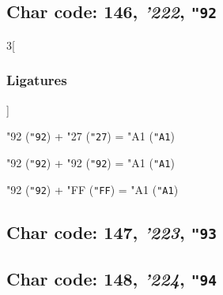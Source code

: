\documentclass{article}
\newlength{\maxcharwidth}
\begin{document}
\subsection{Char code: 146, {\it'222}, {\tt"92}}
\label{char_146}


\begin{multicols}{3}[\subsubsection{Ligatures}]

{\testfont\char"92\noboundary} ({\tt"92}) + {\testfont\char"27\noboundary} ({\tt"27}) = {\testfont\char"A1\noboundary} ({\tt"A1}) 

{\testfont\char"92\noboundary} ({\tt"92}) + {\testfont\char"92\noboundary} ({\tt"92}) = {\testfont\char"A1\noboundary} ({\tt"A1}) 

{\testfont\char"92\noboundary} ({\tt"92}) + {\testfont\char"FF\noboundary} ({\tt"FF}) = {\testfont\char"A1\noboundary} ({\tt"A1}) 

\end{multicols}

\subsection{Char code: 147, {\it'223}, {\tt"93}}
\label{char_147}


\subsection{Char code: 148, {\it'224}, {\tt"94}}
\label{char_148}

\end{document}
